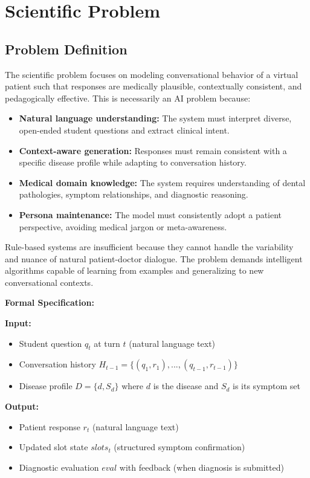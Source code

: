 \documentclass[runningheads,a4paper,11pt]{report}
\begin{document}
\chapter{Scientific Problem}
\label{chapter:scientificProblem}

\section{Problem Definition}
\label{section:problemDefinition}

The scientific problem focuses on modeling conversational behavior of a virtual patient such that responses are medically plausible, contextually consistent, and pedagogically effective. This is necessarily an AI problem because:

\begin{itemize}
\item \textbf{Natural language understanding:} The system must interpret diverse, open-ended student questions and extract clinical intent.
\item \textbf{Context-aware generation:} Responses must remain consistent with a specific disease profile while adapting to conversation history.
\item \textbf{Medical domain knowledge:} The system requires understanding of dental pathologies, symptom relationships, and diagnostic reasoning.
\item \textbf{Persona maintenance:} The model must consistently adopt a patient perspective, avoiding medical jargon or meta-awareness.
\end{itemize}

Rule-based systems are insufficient because they cannot handle the variability and nuance of natural patient-doctor dialogue. The problem demands intelligent algorithms capable of learning from examples and generalizing to new conversational contexts.

\textbf{Formal Specification:}

\textbf{Input:} 
\begin{itemize}
\item Student question $q_t$ at turn $t$ (natural language text)
\item Conversation history $H_{t-1} = \{(q_1, r_1), ..., (q_{t-1}, r_{t-1})\}$
\item Disease profile $D = \{d, S_d\}$ where $d$ is the disease and $S_d$ is its symptom set
\end{itemize}

\textbf{Output:}
\begin{itemize}
\item Patient response $r_t$ (natural language text)
\item Updated slot state $slots_t$ (structured symptom confirmation)
\item Diagnostic evaluation $eval$ with feedback (when diagnosis is submitted)
\end{itemize}
\end{document}
